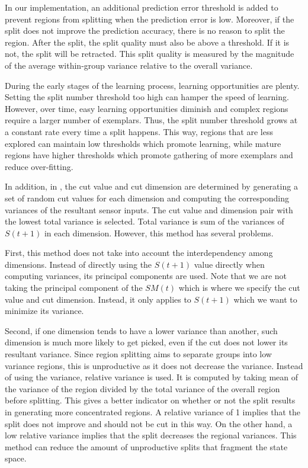In our implementation, an additional prediction error threshold is added to prevent regions from splitting when the prediction error is low. Moreover, if the split does not improve the prediction accuracy, there is no reason to split the region. After the split, the split quality must also be above a threshold. If it is not, the split will be retracted. This split quality is measured by the magnitude of the average within-group variance relative to the overall variance.

During the early stages of the learning process, learning opportunities are plenty. Setting the split number threshold too high can hamper the speed of learning. However, over time, easy learning opportunities diminish and complex regions require a larger number of exemplars. Thus, the split number threshold grows at a constant rate every time a split happens. This way, regions that are less explored can maintain low thresholds which promote learning, while mature regions have higher thresholds which promote gathering of more exemplars and reduce over-fitting.

In addition, in \cite{Oudeyer2007}, the cut value and cut dimension are determined by generating a set of random cut values for each dimension and computing the corresponding variances of the resultant sensor inputs. The cut value and dimension pair with the lowest total variance is selected. Total variance is sum of the variances of $S(t+1)$ in each dimension. However, this method has several problems. 

First, this method does not take into account the interdependency among dimensions. Instead of directly using the $S(t+1)$ value directly when computing variances, its principal components are used. Note that we are not taking the principal component of the $SM(t)$ which is where we specify the cut value and cut dimension. Instead, it only applies to $S(t+1)$ which we want to minimize its variance. 

Second, if one dimension tends to have a lower variance than another, such dimension is much more likely to get picked, even if the cut does not lower its resultant variance. Since region splitting aims to separate groups into low variance regions, this is unproductive as it does not decrease the variance. Instead of using the variance, relative variance is used. It is computed by taking mean of the variance of the region divided by the total variance of the overall region before splitting. This gives a better indicator on whether or not the split results in generating more concentrated regions. A relative variance of 1 implies that the split does not improve and should not be cut in this way. On the other hand, a low relative variance implies that the split decreases the regional variances. This method can reduce the amount of unproductive splits that fragment the state space.

